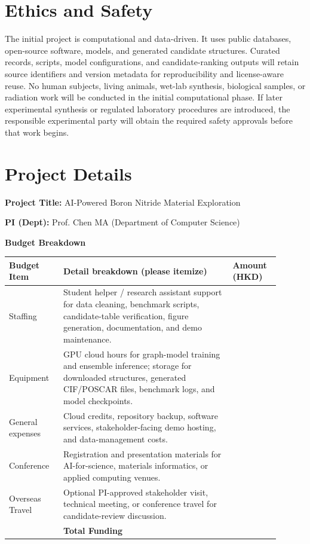 \documentclass[10pt,a4paper]{article}
\newcommand{\blank}[1][7em]{\colorbox{yellow!35}{\rule{0pt}{1.05em}\hspace{#1}}}
\begin{document}
\section{Ethics and Safety}
The initial project is computational and data-driven. It uses public databases, open-source software, models, and generated candidate structures. Curated records, scripts, model configurations, and candidate-ranking outputs will retain source identifiers and version metadata for reproducibility and license-aware reuse. No human subjects, living animals, wet-lab synthesis, biological samples, or radiation work will be conducted in the initial computational phase. If later experimental synthesis or regulated laboratory procedures are introduced, the responsible experimental party will obtain the required safety approvals before that work begins.

\clearpage
\section*{Project Details}
\textbf{Project Title:} AI-Powered Boron Nitride Material Exploration

\textbf{PI (Dept):} Prof. Chen MA (Department of Computer Science)

\textbf{Budget Breakdown}
\begin{center}
\small
\begin{tabular}{>{\raggedright\arraybackslash}p{0.18\linewidth}>{\raggedright\arraybackslash}p{0.57\linewidth}>{\raggedright\arraybackslash}p{0.15\linewidth}}
\toprule
\textbf{Budget Item} &
\textbf{Detail breakdown (please itemize)} &
\textbf{Amount (HKD)}\\
\midrule
Staffing & Student helper / research assistant support for data cleaning, benchmark scripts, candidate-table verification, figure generation, documentation, and demo maintenance. & \blank\\
Equipment & GPU cloud hours for graph-model training and ensemble inference; storage for downloaded structures, generated CIF/POSCAR files, benchmark logs, and model checkpoints. & \blank\\
General expenses & Cloud credits, repository backup, software services, stakeholder-facing demo hosting, and data-management costs. & \blank\\
Conference & Registration and presentation materials for AI-for-science, materials informatics, or applied computing venues. & \blank\\
Overseas Travel & Optional PI-approved stakeholder visit, technical meeting, or conference travel for candidate-review discussion. & \blank\\
\midrule
 & \textbf{Total Funding} & \blank\\
\bottomrule
\end{tabular}
\end{center}
\end{document}
